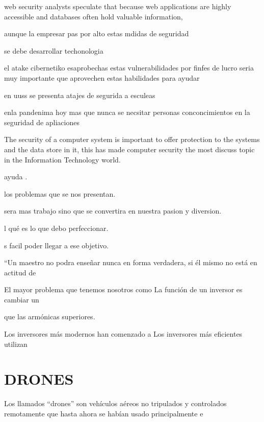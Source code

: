 \documentclass[12pt]{article}
\begin{document}
web security analysts speculate that because web applications are
highly accessible and databases often hold valuable information,

aunque la empresar pas por alto estas mdidas de seguridad 

se debe desarrollar techonologia 


el atake cibernetiko esaprobechas estas vulnerabilidades por finfes de lucro seria muy importante que aprovechen  estas habilidades para ayudar 


en uuss se presenta atajes de segurida a esculeas 

enla pandenima hoy mas que nunca se necsitar personas conconcimientos en la seguridad de apliaciones 



The security of a computer system is important to offer protection to the systems and the data store in it, this has made computer security the most discuss topic in the Information Technology world.


\vspace{10PT}
 ayuda .

\vspace{15PT}
 los problemas que se nos presentan.

\vspace{15PT}
 sera mas trabajo sino que se convertira en nuestra pasion y diversion.

\vspace{15PT}
l qué es lo que debo perfeccionar.

\vspace{15PT}
s facil poder llegar a ese objetivo.
 
\vspace{15PT}
“Un maestro no podra enseñar nunca en forma verdadera, si él mismo no está en actitud de 

\vspace{15PT}
El mayor problema que tenemos nosotros como 
La función de un inversor es cambiar un 

\vspace{15PT}
que las armónicas superiores.

\vspace{15PT}
Los inversores más modernos han comenzado a 
\vspace{15PT}
Los inversores más eficientes utilizan 



\vspace{30pt}
\section{DRONES}

Los llamados “drones” son vehículos aéreos no tripulados y controlados remotamente que hasta ahora se habían usado principalmente e

 
\end{document}
